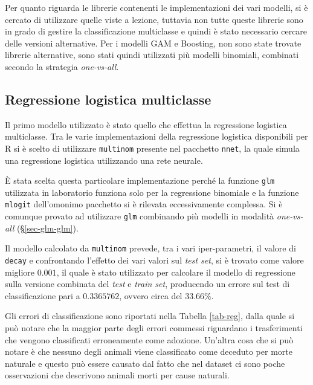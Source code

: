 Per quanto riguarda le librerie contenenti le implementazioni dei vari modelli, si è cercato di utilizzare quelle viste a lezione, tuttavia non tutte queste librerie sono in grado di gestire la classificazione multiclasse e quindi è stato necessario cercare delle versioni alternative. Per i modelli GAM e Boosting, non sono state trovate librerie alternative, sono stati quindi utilizzati più modelli binomiali, combinati secondo la strategia \textit{one-vs-all}.

\subsection{Regressione logistica multiclasse}

Il primo modello utilizzato è stato quello che effettua la regressione logistica multiclasse. Tra le varie implementazioni della regressione logistica disponibili per R si è scelto di utilizzare \texttt{multinom} presente nel pacchetto \texttt{nnet}, la quale simula una regressione logistica utilizzando una rete neurale. 

\`E stata scelta questa particolare implementazione perché la funzione \texttt{glm} utilizzata in laboratorio funziona solo per la regressione binomiale e la funzione \texttt{mlogit} dell'omonimo pacchetto si è rilevata eccessivamente complessa. Si è comunque provato ad utilizzare \texttt{glm} combinando più modelli in modalità \textit{one-vs-all} (§\ref{sec-glm-glm}).

Il modello calcolato da \texttt{multinom} prevede, tra i vari iper-parametri, il valore di \texttt{decay} e confrontando l'effetto dei vari valori sul \textit{test set}, si è trovato come valore migliore $0.001$, il quale è stato utilizzato per calcolare il modello di regressione sulla versione combinata del \textit{test} e \textit{train set}, producendo un errore sul test di classificazione pari a $0.3365762$, ovvero circa del $33.66\%$.

Gli errori di classificazione sono riportati nella Tabella \ref{tab-reg}, dalla quale si può notare che la maggior parte degli errori commessi riguardano i trasferimenti che vengono classificati erroneamente come adozione. Un'altra cosa che si può notare è che nessuno degli animali viene classificato come deceduto per morte naturale e questo può essere causato dal fatto che nel dataset ci sono poche osservazioni che descrivono animali morti per cause naturali.


